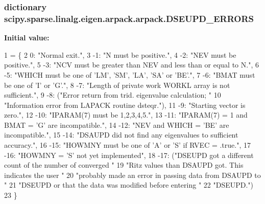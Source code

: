 \subsubsection[{D\+S\+E\+U\+P\+D\+\_\+\+E\+R\+R\+O\+R\+S}]{\setlength{\rightskip}{0pt plus 5cm}dictionary scipy.\+sparse.\+linalg.\+eigen.\+arpack.\+arpack.\+D\+S\+E\+U\+P\+D\+\_\+\+E\+R\+R\+O\+R\+S}\label{namespacescipy_1_1sparse_1_1linalg_1_1eigen_1_1arpack_1_1arpack_a471a37fcb4c527bdcac4225e6dfd810e}
{\bfseries Initial value\+:}
\begin{DoxyCode}
1 = \{
2     0: \textcolor{stringliteral}{"Normal exit."},
3     -1: \textcolor{stringliteral}{"N must be positive."},
4     -2: \textcolor{stringliteral}{"NEV must be positive."},
5     -3: \textcolor{stringliteral}{"NCV must be greater than NEV and less than or equal to N."},
6     -5: \textcolor{stringliteral}{"WHICH must be one of 'LM', 'SM', 'LA', 'SA' or 'BE'."},
7     -6: \textcolor{stringliteral}{"BMAT must be one of 'I' or 'G'."},
8     -7: \textcolor{stringliteral}{"Length of private work WORKL array is not sufficient."},
9     -8: (\textcolor{stringliteral}{"Error return from trid. eigenvalue calculation; "}
10          \textcolor{stringliteral}{"Information error from LAPACK routine dsteqr."}),
11     -9: \textcolor{stringliteral}{"Starting vector is zero."},
12     -10: \textcolor{stringliteral}{"IPARAM(7) must be 1,2,3,4,5."},
13     -11: \textcolor{stringliteral}{"IPARAM(7) = 1 and BMAT = 'G' are incompatible."},
14     -12: \textcolor{stringliteral}{"NEV and WHICH = 'BE' are incompatible."},
15     -14: \textcolor{stringliteral}{"DSAUPD  did not find any eigenvalues to sufficient accuracy."},
16     -15: \textcolor{stringliteral}{"HOWMNY must be one of 'A' or 'S' if RVEC = .true."},
17     -16: \textcolor{stringliteral}{"HOWMNY = 'S' not yet implemented"},
18     -17: (\textcolor{stringliteral}{"DSEUPD  got a different count of the number of converged "}
19           \textcolor{stringliteral}{"Ritz values than DSAUPD  got.  This indicates the user "}
20           \textcolor{stringliteral}{"probably made an error in passing data from DSAUPD  to "}
21           \textcolor{stringliteral}{"DSEUPD  or that the data was modified before entering  "}
22           \textcolor{stringliteral}{"DSEUPD."})
23 \}
\end{DoxyCode}
\hypertarget{namespacescipy_1_1sparse_1_1linalg_1_1eigen_1_1arpack_1_1arpack_a3cccb91bf65be251bd54cf2ef01f4274}{}
